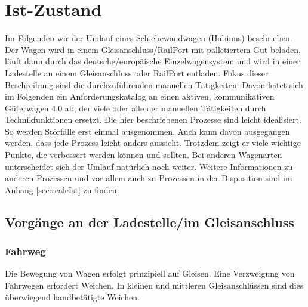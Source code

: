 \section{Ist-Zustand}\label{sec:Istzustand} %
Im Folgenden wir der Umlauf eines \gls{Schiebewandwagen} (Habinns) beschrieben. Der Wagen wird in einem \gls{Gleisanschluss}/RailPort mit palletiertem Gut beladen, läuft dann durch das deutsche/europäische Einzelwagensystem und wird in einer Ladestelle an einem Gleisanschluss oder RailPort entladen. Fokus dieser Beschreibung sind die durchzuführenden manuellen Tätigkeiten. Davon leitet sich im Folgenden ein Anforderungskatalog an einen aktiven, kommunikativen Güterwagen 4.0 ab, der viele oder alle der manuellen Tätigkeiten durch Technikfunktionen ersetzt.
Die hier beschriebenen Prozesse sind leicht idealisiert. So werden Störfälle erst einmal ausgenommen. Auch kann davon ausgegangen werden, dass jede Prozess leicht anders aussieht. Trotzdem zeigt er viele wichtige Punkte, die verbessert werden können und sollten. Bei anderen Wagenarten unterscheidet sich der Umlauf natürlich noch weiter. Weitere Informationen zu anderen Prozessen und vor allem auch zu Prozessen in der Disposition sind im Anhang \ref{sec:realeIst} zu finden. \par
\subsection{Vorgänge an der Ladestelle/im Gleisanschluss}
\subsubsection{Fahrweg} \label{sec:Fahrweg}
Die Bewegung von Wagen erfolgt prinzipiell auf Gleisen. Eine Verzweigung von Fahrwegen erfordert Weichen. In kleinen und mittleren Gleisanschlüssen sind dies überwiegend handbetätigte Weichen. 
